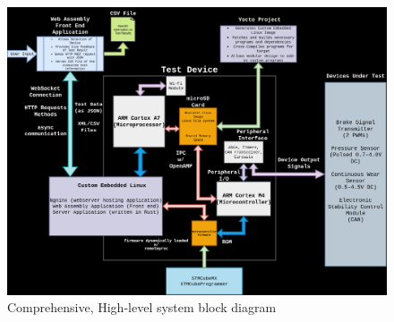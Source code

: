 \documentclass[12pt]{article}
\begin{document}
\begin{figure}[H]
  \includegraphics[width=\textwidth]{../assets/block_diagram.png}
  \caption{Comprehensive, High-level system block diagram}
\end{figure}
\end{document}
